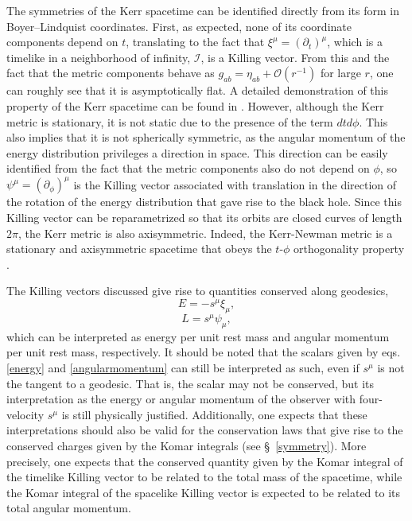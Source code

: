 \documentclass[
12pt,		%
openright,	%
twoside,  %
a4paper,			%
chapter=TITLE,		%
english,			%
french,				%
spanish,			%
brazil				%
]{USPSC-classe/USPSC}
\begin{document}
The symmetries of the Kerr spacetime can be identified directly from its form in Boyer–Lindquist coordinates. First, as expected, none of its coordinate components depend on $t$, translating to the fact that $\xi^{\mu}=(\partial_{t})^{\mu}$, which is a timelike in a neighborhood of infinity, $\mathscr{I}$, is a Killing vector. From this and the fact that the metric components behave as $g_{ab}=\eta_{ab}+\mathcal{O}(r^{-1})$ for large $r$, one can roughly see that it is asymptotically flat. A detailed demonstration of this property of the Kerr spacetime can be found in \cite{Ashtekar1978}. However, although the Kerr metric is stationary, it is not static due to the presence of the term $dtd\phi$. This also implies that it is not spherically symmetric, as the angular momentum of the energy distribution privileges a direction in space. This direction can be easily identified from the fact that the metric components also do not depend on $\phi$, so $\psi^{\mu}=(\partial_{\phi})^{\mu}$ is the Killing vector associated with translation in the direction of the rotation of the energy distribution that gave rise to the black hole. Since this Killing vector can be reparametrized so that its orbits are closed curves of length $2\pi$, the Kerr metric is also axisymmetric. Indeed, the Kerr-Newman metric is a stationary and axisymmetric spacetime that obeys the $t$-$\phi$ orthogonality property \cite{Heusler1996}.

The Killing vectors discussed give rise to quantities conserved along geodesics, 
\begin{equation}\label{energy}
    E=-s^{\mu}\xi_{\mu},
\end{equation}
\begin{equation}\label{angularmomentum}
    L=s^{\mu}\psi_{\mu},
\end{equation}
which can be interpreted as energy per unit rest mass and angular momentum per unit rest mass, respectively. It should be noted that the scalars given by eqs. \ref{energy} and \ref{angularmomentum} can still be interpreted as such, even if $s^{\mu}$ is not the tangent to a geodesic. That is, the scalar may not be conserved, but its interpretation as the energy or angular momentum of the observer with four-velocity $s^{\mu}$ is still physically justified. Additionally, one expects that these interpretations should also be valid for the conservation laws that give rise to the conserved charges given by the Komar integrals (see \S~\ref{symmetry}). More precisely, one expects that the conserved quantity given by the Komar integral of the timelike Killing vector to be related to the total mass of the spacetime, while the Komar integral of the spacelike Killing vector is expected to be related to its total angular momentum. 
\end{document}
